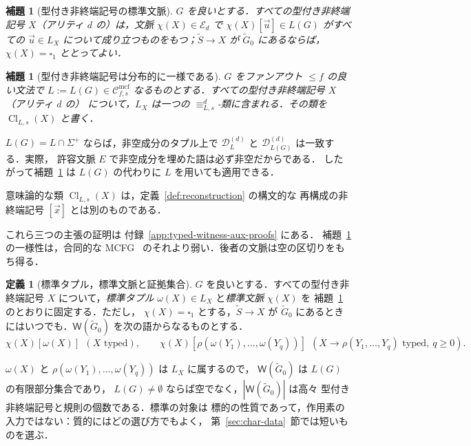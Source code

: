 \documentclass[11pt,a4paper]{ltjsarticle}
\numberwithin{equation}{section}
\theoremstyle{plain}
\newtheorem{lemma}[theorem]{補題}
\theoremstyle{definition}
\newtheorem{definition}[theorem]{定義}
\theoremstyle{remark}
\newcommand{\Wit}{\mathsf{W}}
\newcommand{\Cmcf}[2]{\mathcal{C}^{\mathrm{mcf}}_{#1,#2}}
\newcommand{\D}{\mathcal{D}}
\newcommand{\tuple}[1]{\vec{#1}}
\newcommand{\blank}{\square}
\theoremstyle{plain}
\begin{document}
\begin{lemma}[型付き非終端記号の標準文脈]
\label{lem:identity-canonical-contexts}
$G$ を良いとする．すべての型付き非終端記号 $X$（アリティ $d$ の）は，文脈
$\chi(X)\in\mathcal E_d$ で $\chi(X)[\tuple u]\in L(G)$ がすべての
$\tuple u\in L_X$ について成り立つものをもつ；$\widetilde S\to X$ が $\widetilde G_0$ にあるならば，
$\chi(X)=\blank_1$ ととってよい．
\end{lemma}

\begin{lemma}[型付き非終端記号は分布的に一様である]
\label{lem:typed-homogeneity}
$G$ をファンアウト $\le f$ の良い文法で $L:=L(G)\in\Cmcf{f}{s}$ なるものとする．すべての型付き非終端記号 $X$（アリティ $d$ の）
について，$L_X$ は一つの $\equiv_{L,s}^d$-類に含まれる．その類を
$\operatorname{Cl}_{L,s}(X)$ と書く．
\end{lemma}

$L(G)=L\cap\Sigma^+$ ならば，非空成分のタプル上で
$\D_L^{(d)}$ と $\D_{L(G)}^{(d)}$ は一致する．実際，
許容文脈 $E$ で非空成分を埋めた語は必ず非空だからである．
したがって補題~\ref{lem:typed-homogeneity} は $L(G)$ の代わりに
$L$ を用いても適用できる．

意味論的な類 $\operatorname{Cl}_{L,s}(X)$ は，定義~\ref{def:reconstruction} の構文的な
再構成の非終端記号 $[\tuple x]$ とは別のものである．

これら三つの主張の証明は
付録~\ref{app:typed-witness-aux-proofs} にある．
補題~\ref{lem:typed-homogeneity} の一様性は，合同的な
MCFG~\cite{ClarkYoshinaka2016} のそれより弱い．後者の文脈は空の区切りをもち得る．

\begin{definition}[標準タプル，標準文脈と証拠集合]
\label{def:target-canonical}
\label{def:witness-set}
$G$ を良いとする．すべての型付き非終端記号 $X$ について，\emph{標準タプル}
$\omega(X)\in L_X$ と\emph{標準文脈} $\chi(X)$ を
補題~\ref{lem:identity-canonical-contexts} のとおりに固定する．ただし，
$\chi(X)=\blank_1$ とする，$\widetilde S\to X$ が $\widetilde G_0$ にあるときにはいつでも．$\Wit(\widetilde G_0)$
を次の語からなるものとする．
\[
 \chi(X)[\omega(X)]\ \ (X\text{ typed}),\qquad
 \chi(X)[\rho(\omega(Y_1),\ldots,\omega(Y_q))]\ \
 (X\to\rho(Y_1,\ldots,Y_q)\text{ typed},\ q\ge0).
\]
\end{definition}

$\omega(X)$ と $\rho(\omega(Y_1),\ldots,\omega(Y_q))$ は $L_X$ に属するので，
$\Wit(\widetilde G_0)$ は $L(G)$ の有限部分集合であり，
$L(G)\ne\emptyset$ ならば空でなく，$|\Wit(\widetilde G_0)|$ は高々
型付き非終端記号と規則の個数である．標準の対象は
標的の性質であって，作用素の入力ではない：質的にはどの選び方でもよく，
第~\ref{sec:char-data}~節では短いものを選ぶ．
\end{document}
